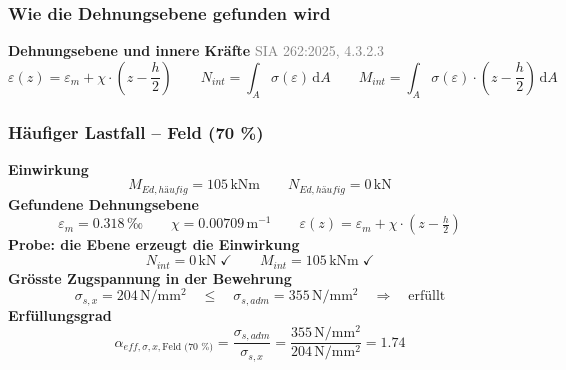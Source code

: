 \documentclass[11pt,a4paper]{article}
\newcommand{\normref}[1]{{\small\textcolor{gray}{#1}}}
\begin{document}
\subsubsection{Wie die Dehnungsebene gefunden wird}
\noindent\textbf{Dehnungsebene und innere Kräfte} \hfill \normref{SIA 262:2025, 4.3.2.3}
\begin{equation*}
\varepsilon(z) = \varepsilon_m + \chi \cdot \left(z - \frac{h}{2}\right) \qquad N_{int} = \int_A \sigma\left(\varepsilon\right)\,\mathrm{d}A \qquad M_{int} = \int_A \sigma\left(\varepsilon\right) \cdot \left(z - \frac{h}{2}\right)\,\mathrm{d}A
\end{equation*}
\subsubsection{Häufiger Lastfall – Feld (70 \%)}
\noindent\textbf{Einwirkung}
\begin{equation*}
M_{Ed,häufig} = 105\,\mathrm{kNm} \qquad N_{Ed,häufig} = 0\,\mathrm{kN}
\end{equation*}
\noindent\textbf{Gefundene Dehnungsebene}
\begin{equation*}
\varepsilon_m = 0.318\,\text{‰} \qquad \chi = 0.00709\,\mathrm{m}^{-1} \qquad \varepsilon(z) = \varepsilon_m + \chi \cdot \left(z - \tfrac{h}{2}\right)
\end{equation*}
\noindent\textbf{Probe: die Ebene erzeugt die Einwirkung}
\begin{equation*}
N_{int} = 0\,\mathrm{kN} \;\checkmark \qquad M_{int} = 105\,\mathrm{kNm} \;\checkmark
\end{equation*}
\noindent\textbf{Grösste Zugspannung in der Bewehrung}
\begin{equation*}
\sigma_{s,x} = 204\,\mathrm{N}/\mathrm{mm}^{2} \quad \le \quad \sigma_{s,adm} = 355\,\mathrm{N}/\mathrm{mm}^{2} \quad \Rightarrow \quad \text{erfüllt}
\end{equation*}
\noindent\textbf{Erfüllungsgrad}
\begin{equation*}
\alpha_{eff,\sigma,x,\text{Feld (70 \%)}} = \frac{\sigma_{s,adm}}{\sigma_{s,x}} = \frac{355\,\mathrm{N}/\mathrm{mm}^{2}}{204\,\mathrm{N}/\mathrm{mm}^{2}} = 1.74
\end{equation*}
\end{document}
